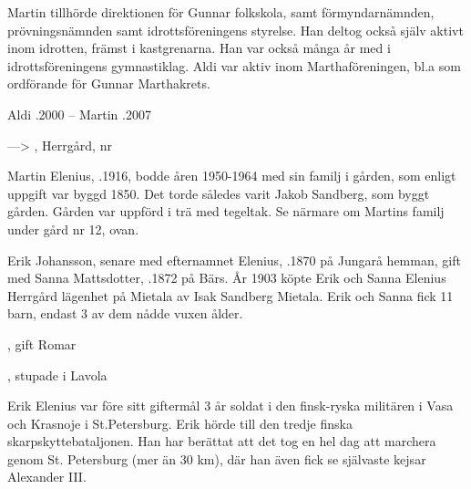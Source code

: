 Martin tillhörde direktionen för Gunnar folkskola, samt förmyndarnämnden, prövningsnämnden samt idrottsföreningens styrelse. Han deltog också själv aktivt inom idrotten, främst i kastgrenarna. Han var också många år med i idrottsföreningens gymnastiklag. Aldi var aktiv inom Marthaföreningen, bl.a som ordförande för Gunnar Marthakrets.

Aldi .2000  --  Martin .2007


---> , Herrgård,	nr 

Martin Elenius, .1916,  bodde åren 1950-1964 med sin familj i gården, som enligt uppgift var byggd 1850. Det torde således varit Jakob Sandberg, som byggt gården. Gården var uppförd i trä med tegeltak. Se närmare om Martins familj under gård nr 12, ovan.

Erik Johansson, senare med efternamnet Elenius,  .1870 på Jungarå hemman, gift med Sanna Mattsdotter,  .1872 på Bärs. År 1903 köpte Erik och Sanna Elenius Herrgård lägenhet på Mietala av Isak Sandberg Mietala. Erik och Sanna fick 11 barn, endast 3 av dem nådde vuxen ålder.
\begin{jhchildren}
  \item {}
  \item {}
  \item {}
  \item {}
  \item {}, gift Romar
  \item {}
  \item {}
  \item {}
  \item {}
  \item {}
  \item {}, stupade i Lavola
\end{jhchildren}
Erik Elenius var före sitt giftermål 3 år soldat i den finsk-ryska militären i Vasa och Krasnoje i St.Petersburg. Erik hörde till den tredje finska skarpskyttebataljonen. Han har berättat att det tog en hel dag att marchera genom St. Petersburg (mer än 30 km), där han även fick se självaste kejsar Alexander III.

